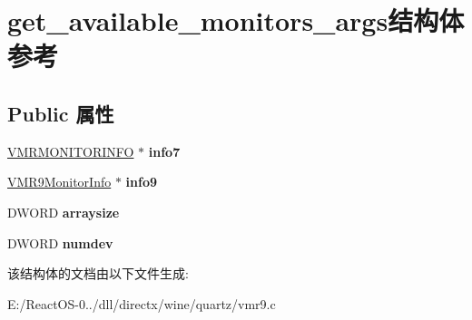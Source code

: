 \hypertarget{structget__available__monitors__args}{}\section{get\+\_\+available\+\_\+monitors\+\_\+args结构体 参考}
\label{structget__available__monitors__args}
\subsection*{Public 属性}
\begin{DoxyCompactItemize}
\item 
\mbox{\label{structget__available__monitors__args_af079042897db3d1cbc68c12a7c8961ab}} 
\hyperlink{structtag_v_m_r_m_o_n_i_t_o_r_i_n_f_o}{V\+M\+R\+M\+O\+N\+I\+T\+O\+R\+I\+N\+FO} $\ast$ {\bfseries info7}
\item 
\mbox{\label{structget__available__monitors__args_aa85a419c1af9d9a4007d56ed7236a221}} 
\hyperlink{struct___v_m_r9_monitor_info}{V\+M\+R9\+Monitor\+Info} $\ast$ {\bfseries info9}
\item 
\mbox{\label{structget__available__monitors__args_a2b740e7817c91f73f21073be08eabb86}} 
D\+W\+O\+RD {\bfseries arraysize}
\item 
\mbox{\label{structget__available__monitors__args_a7097caac3bfeb3a1d60527f1ee009e29}} 
D\+W\+O\+RD {\bfseries numdev}
\end{DoxyCompactItemize}


该结构体的文档由以下文件生成\+:\begin{DoxyCompactItemize}
\item 
E\+:/\+React\+O\+S-\/0../dll/directx/wine/quartz/vmr9.\+c\end{DoxyCompactItemize}
